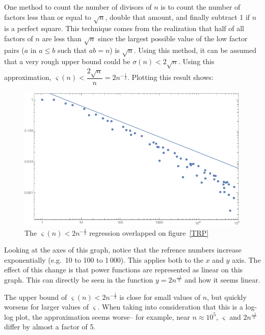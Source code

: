 \documentclass[12pt]{article}
\begin{document}
			One method to count the number of divisors of $n$ is to count the number of factors less than or equal to $\sqrt{n}$, double that amount, and finally subtract 1 if $n$ is a perfect square. This technique comes from the realization that half of all factors of $n$ are less than $\sqrt{n}$ since the largest possible value of the low factor pairs ($a$ in $a\leq b$ such that $ab=n$) is $\sqrt{n}$. Using this method, it can be assumed that a very rough upper bound could be $\sigma(n)< 2\sqrt{n}$. Using this approximation, $\varsigma(n)<\dfrac{2\sqrt{n}}{n}= 2n^{-\frac{1}{2}}$. Plotting this result shows:
			\begin{figure}[H]
				\includegraphics[width=\textwidth]{../Images/TRPsqrtREG.png}
				\caption{The $\varsigma(n)< 2n^{-\frac{1}{2}}$ regression overlapped on figure~\ref{TRP}\label{TRPsqrt}}
			\end{figure}
			\vspace{-0.5cm}
			Looking at the axes of this graph, notice that the refrence numbers increase exponentially (e.g.\ 10 to 100 to 1\,000). This applies both to the $x$ and $y$ axis. The effect of this change is that power functions are represented as linear on this graph. This can directly be seen in the function $y=2n^{\frac{-1}{2}}$ and how it seems linear.

			The upper bound of $\varsigma(n)< 2n^{-\frac{1}{2}}$ is close for small values of $n$, but quickly worsens for larger values of $\varsigma$. When taking into consideration that this is a log-log plot, the approximation seems worse-- for example, near $n\approx 10^5$, $\varsigma$ and $2n^{\frac{-1}{2}}$ differ by almost a factor of 5.
\end{document}
